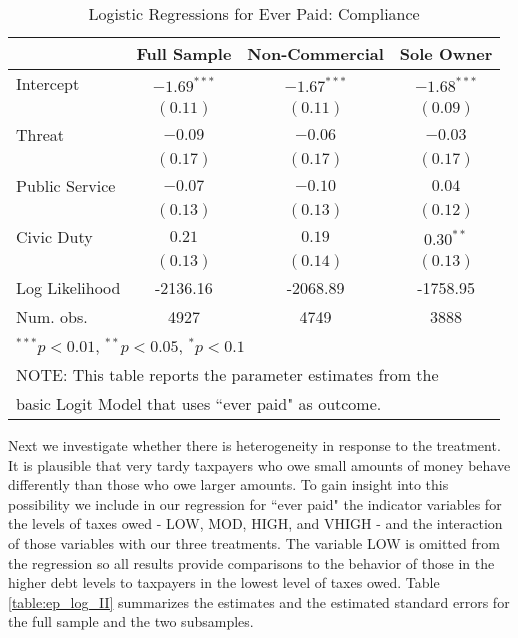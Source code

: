 \documentclass[12pt,titlepage]{article}
\begin{document}
\begin{table}[htbp]
\caption{Logistic Regressions for Ever Paid: Compliance}
\label{table:ep_log_I}
\begin{center}
\begin{tabular}{l c c c }
\hline
               & Full Sample & Non-Commercial & Sole Owner \\
\hline
Intercept      & $-1.69^{***}$ & $-1.67^{***}$ & $-1.68^{***}$ \\
               & $(0.11)$      & $(0.11)$      & $(0.09)$      \\
Threat         & $-0.09$       & $-0.06$       & $-0.03$       \\
               & $(0.17)$      & $(0.17)$      & $(0.17)$      \\
Public Service & $-0.07$       & $-0.10$       & $0.04$        \\
               & $(0.13)$      & $(0.13)$      & $(0.12)$      \\
Civic Duty     & $0.21$        & $0.19$        & $0.30^{**}$   \\
               & $(0.13)$      & $(0.14)$      & $(0.13)$      \\
\hline
Log Likelihood & -2136.16      & -2068.89      & -1758.95      \\
Num. obs.      & 4927          & 4749          & 3888          \\
\hline
\multicolumn{4}{l}{\scriptsize{$^{***}p<0.01$, $^{**}p<0.05$, $^*p<0.1$}} \\
\multicolumn{4}{l}{NOTE: This table reports the parameter estimates from the} \\
\multicolumn{4}{l}{basic Logit Model that uses ``ever paid" as outcome.}
\end{tabular}
\end{center}
\end{table}

Next we investigate whether there is heterogeneity in response to the
treatment. It is plausible that very tardy taxpayers who owe small amounts of
money behave differently than those who owe larger amounts.  To gain
insight into this possibility we include in our regression for ``ever
paid" the indicator variables for the levels of taxes owed - LOW, MOD,
HIGH, and VHIGH - and the interaction of those variables with our
three treatments.  The variable LOW is omitted from the regression so
all results provide comparisons to the behavior of those in the higher
debt levels to taxpayers in the lowest level of taxes owed.  Table
\ref{table:ep_log_II} summarizes the estimates and the estimated standard errors
for the full sample and the two subsamples.
\end{document}
